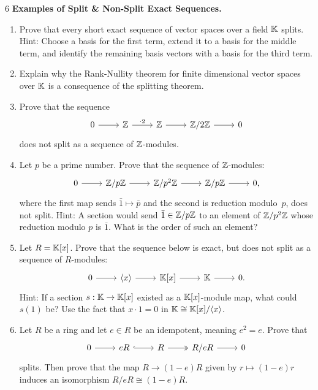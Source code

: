 \documentclass[Notebook.tex]{subfiles}
\begin{document}
\begin{problem}{6} \textbf{Examples of Split \& Non-Split Exact Sequences.}
    \begin{enumerate}
        \item Prove that every short exact sequence of vector spaces over a field $\mathbb K$ splits. Hint: Choose a basis for the first term, extend it to a basis for the middle term, and identify the remaining basis vectors with a basis for the third term. 
        \item Explain why the Rank-Nullity theorem for finite dimensional vector spaces over $\mathbb K$ is a consequence of the splitting theorem. 
        \item Prove that the sequence
        \[
        \begin{tikzcd}
        0 \ar[r] & \Z \ar[r, "\cdot 2"] & \Z \ar[r] & \Z/2\Z \ar[r] & 0
        \end{tikzcd}
        \]
        does not split as a sequence of $\mathbb Z$-modules.
        \item Let $p$ be a prime number. Prove that the sequence of $\mathbb Z$-modules:
        \[
        \begin{tikzcd}
        0 \ar[r] & \Z/p\Z \ar[r] & \Z/p^2\Z \ar[r] & \Z/p\Z \ar[r] & 0,
        \end{tikzcd}
        \]
        where the first map sends $\bar 1\mapsto\bar p$ and the second is reduction modulo~$p$, does not split. Hint: A section would send $\bar 1\in \mathbb Z/p\mathbb Z$ to an element of $\mathbb Z/p^2\mathbb Z$ whose reduction modulo $p$ is $\bar 1$. What is the order of such an element?
        \item Let $R=\mathbb K[x]$. Prove that the sequence below is exact, but does not split as a sequence of $R$-modules:
        \[
        \begin{tikzcd}
        0 \ar[r] & \langle x \rangle \ar[r] & \K[x] \ar[r] & \K \ar[r] & 0.
        \end{tikzcd}
        \]
        Hint: If a section $s:\mathbb K\to \mathbb K[x]$ existed as a $\mathbb K[x]$-module map, what could $s(1)$ be? Use the fact that $x\cdot 1=0$ in $\mathbb K\cong \mathbb K[x]/\langle x\rangle$.
        \item Let $R$ be a ring and let $e\in R$ be an idempotent, meaning $e^2=e$. Prove that
        \[
        \begin{tikzcd}
        0 \ar[r] & eR \ar[r, hook] & R \ar[r, two heads] & R/eR \ar[r] & 0
        \end{tikzcd}
        \]
        splits. Then prove that the map $R\to (1-e)R$ given by $r\mapsto (1-e)r$ induces an isomorphism $R/eR\cong (1-e)R$.
    \end{enumerate}
\end{problem}
\end{document}
